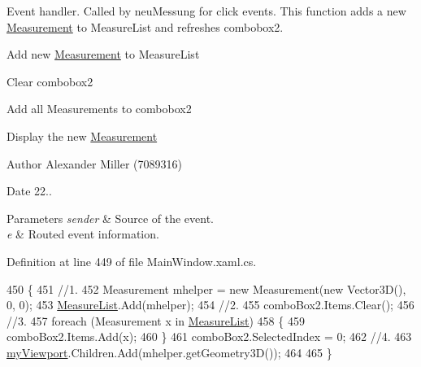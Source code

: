 Event handler. Called by neu\+Messung for click events. This function adds a new \hyperlink{class_l_i_d_a_r___controller_1_1_measurement}{Measurement} to Measure\+List and refreshes combobox2. 


\begin{DoxyEnumerate}
\item Add new \hyperlink{class_l_i_d_a_r___controller_1_1_measurement}{Measurement} to Measure\+List
\item Clear combobox2
\item Add all Measurements to combobox2
\item Display the new \hyperlink{class_l_i_d_a_r___controller_1_1_measurement}{Measurement}
\end{DoxyEnumerate}

\begin{DoxyAuthor}{Author}
Alexander Miller (7089316) 
\end{DoxyAuthor}
\begin{DoxyDate}{Date}
22..
\end{DoxyDate}

\begin{DoxyParams}{Parameters}
{\em sender} & Source of the event. \\
\hline
{\em e} & Routed event information. \\
\hline
\end{DoxyParams}


Definition at line 449 of file Main\+Window.\+xaml.\+cs.


\begin{DoxyCode}
450         \{
451             \textcolor{comment}{//1.}
452             Measurement mhelper = \textcolor{keyword}{new} Measurement(\textcolor{keyword}{new} Vector3D(), 0, 0);
453             \hyperlink{class_l_i_d_a_r___controller_1_1_main_window_add7555b1a79fa1c17cd18dcf98859b9c}{MeasureList}.Add(mhelper);
454             \textcolor{comment}{//2.}
455             comboBox2.Items.Clear();
456             \textcolor{comment}{//3.}
457             \textcolor{keywordflow}{foreach} (Measurement x \textcolor{keywordflow}{in} \hyperlink{class_l_i_d_a_r___controller_1_1_main_window_add7555b1a79fa1c17cd18dcf98859b9c}{MeasureList})
458             \{
459                 comboBox2.Items.Add(x);
460             \}
461             comboBox2.SelectedIndex = 0;
462             \textcolor{comment}{//4.}
463             \hyperlink{class_l_i_d_a_r___controller_1_1_main_window_a4b0350fc0b7116a0d744ee8e489ab34a}{myViewport}.Children.Add(mhelper.getGeometry3D());
464 
465         \}
\end{DoxyCode}
